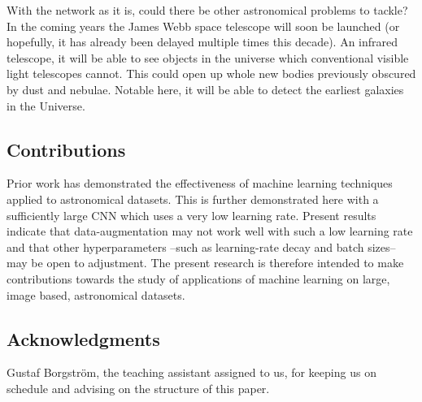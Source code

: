With the network as it is, could there be other astronomical problems to tackle? In the coming years the James Webb space telescope will soon be launched (or hopefully, it has already been delayed multiple times this decade). An infrared telescope, it will be able to see objects in the universe which conventional visible light telescopes cannot. This could open up whole new bodies previously obscured by dust and nebulae. Notable here, it will be able to detect the earliest galaxies in the Universe.


\subsection{Contributions}
Prior work has demonstrated the effectiveness of machine learning techniques applied to astronomical datasets. This is further demonstrated here with a sufficiently large CNN which uses a very low learning rate. Present results indicate that data-augmentation may not work well with such a low learning rate and that other hyperparameters --such as learning-rate decay and batch sizes-- may be open to adjustment. The present research is therefore intended to make contributions towards the study of applications of machine learning on large, image based, astronomical datasets.


\subsection{Acknowledgments}

Gustaf Borgström, the teaching assistant assigned to us, for keeping us on schedule and advising on the structure of this paper.
